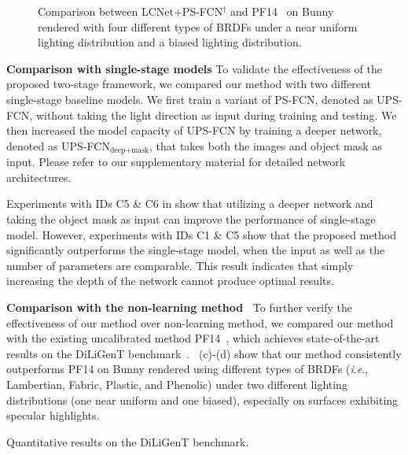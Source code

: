 \documentclass[10pt,journal,compsoc]{IEEEtran}
\newcommand{\ie}{\textit{i}.\textit{e}.}
\newcommand{\rev}[1]{#1}
\renewcommand{\paragraph}[1]{\vspace{0.2em}\noindent \textbf{#1 \hspace{0.2em}}}
\begin{document}
\begin{figure}[t]\centering
    
    \caption{Comparison between LCNet+PS-FCN$^\dag$ and PF14~\cite{papad14closed} on {\sc Bunny} rendered with four different types of BRDFs under a near uniform lighting distribution and a biased lighting distribution.} \label{fig:compare_pf14}
\end{figure}


\paragraph{Comparison with single-stage models}
To validate the effectiveness of the proposed two-stage framework, we compared our method with two different single-stage baseline models.
We first train a variant of PS-FCN, denoted as UPS-FCN, without taking the light direction as input during training and testing.
We then increased the model capacity of UPS-FCN by training a deeper network, denoted as UPS-FCN$_{\text{deep+mask}}$, that takes both the images and object mask as input. 
Please refer to our supplementary material for detailed network architectures.

Experiments with IDs C5 \& C6 in  show that utilizing a deeper network and taking the object mask as input can improve the performance of single-stage model.
However, experiments with IDs C1 \& C5 show that the proposed method significantly outperforms the single-stage model, when the input as well as the number of parameters are comparable.
This result indicates that simply increasing the depth of the network cannot produce optimal results. 

\paragraph{Comparison with the non-learning method~\cite{papad14closed}}
To further verify the effectiveness of our method over non-learning method, we compared our method with the existing uncalibrated method PF14~\cite{papad14closed}, which achieves state-of-the-art results on the DiLiGenT benchmark~\cite{shi2018benchmark}.
\rev{~(c)-(d) show that our method consistently outperforms PF14 on {\sc Bunny} rendered using different types of BRDFs (\ie, Lambertian, Fabric, Plastic, and Phenolic) under two different lighting distributions (one near uniform and one biased), especially on surfaces exhibiting specular highlights.}

\begin{table}[t] \centering
    \caption{Quantitative results on the DiLiGenT benchmark.} \label{tab:quant_light_normal_diligent}
     \vspace{0.4em}
     \vspace{0.4em}
    
\end{table}
\end{document}
